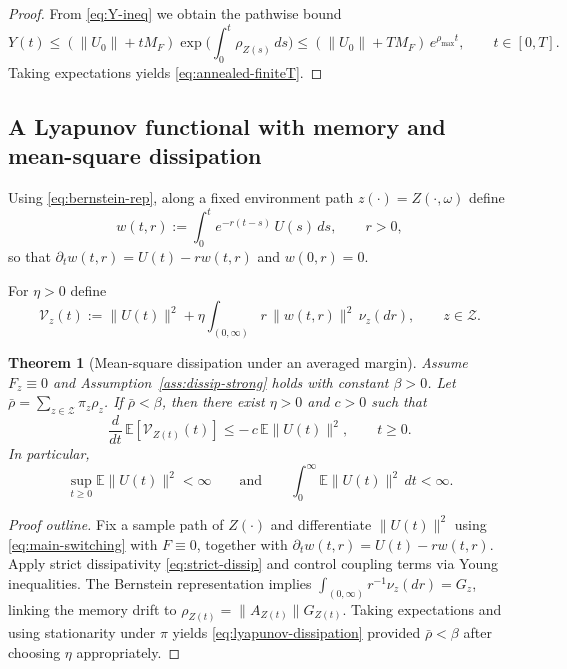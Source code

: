 \documentclass[12pt,a4paper]{article}
\theoremstyle{plain}
\newtheorem{theorem}{Theorem}[section]
\theoremstyle{definition}
\theoremstyle{remark}
\begin{document}
\begin{proof}
	From \eqref{eq:Y-ineq} we obtain the pathwise bound
	\[
	Y(t)\le (\|U_0\|+tM_F)\exp\!\Big(\int_0^t \rho_{Z(s)}\,ds\Big)
	\le (\|U_0\|+TM_F)\,e^{\rho_{\max}t},
	\qquad t\in[0,T].
	\]
	Taking expectations yields \eqref{eq:annealed-finiteT}.
\end{proof}

\subsection{A Lyapunov functional with memory and mean-square dissipation}
\label{subsec:lyap}

Using \eqref{eq:bernstein-rep}, along a fixed environment path $z(\cdot)=Z(\cdot,\omega)$ define
\begin{equation}
	\label{eq:aux-memory}
	w(t,r):=\int_0^t e^{-r(t-s)}\,U(s)\,ds,
	\qquad r>0,
\end{equation}
so that $\partial_t w(t,r)=U(t)-r w(t,r)$ and $w(0,r)=0$.

For $\eta>0$ define
\begin{equation}
	\label{eq:lyapunov}
	\mathcal V_{z}(t)
	:=
	\|U(t)\|^2
	+
	\eta\int_{(0,\infty)} r\,\|w(t,r)\|^2\,\nu_{z}(dr),
	\qquad z\in\mathcal Z.
\end{equation}

\begin{theorem}[Mean-square dissipation under an averaged margin]
	\label{thm:lyapunov-mean-stability}
	Assume $F_z\equiv 0$ and Assumption~\ref{ass:dissip-strong} holds with constant $\beta>0$.
	Let $\bar\rho=\sum_{z\in\mathcal Z}\pi_z\rho_z$.
	If $\bar\rho<\beta$, then there exist $\eta>0$ and $c>0$ such that
	\begin{equation}
		\label{eq:lyapunov-dissipation}
		\frac{d}{dt}\,\mathbb E\!\left[\mathcal V_{Z(t)}(t)\right]
		\le
		-\,c\,\mathbb E\|U(t)\|^2,
		\qquad t\ge 0.
	\end{equation}
	In particular,
	\begin{equation}
		\label{eq:mean-square-bound}
		\sup_{t\ge 0}\mathbb E\|U(t)\|^2<\infty
		\qquad\text{and}\qquad
		\int_0^\infty \mathbb E\|U(t)\|^2\,dt <\infty.
	\end{equation}
\end{theorem}

\begin{proof}[Proof outline]
	Fix a sample path of $Z(\cdot)$ and differentiate $\|U(t)\|^2$ using \eqref{eq:main-switching}
	with $F\equiv 0$, together with $\partial_t w(t,r)=U(t)-r w(t,r)$.
	Apply strict dissipativity \eqref{eq:strict-dissip} and control coupling terms via Young inequalities.
	The Bernstein representation implies $\int_{(0,\infty)} r^{-1}\nu_z(dr)=G_z$, linking the memory drift to
	$\rho_{Z(t)}=\|A_{Z(t)}\|G_{Z(t)}$. Taking expectations and using stationarity under $\pi$ yields
	\eqref{eq:lyapunov-dissipation} provided $\bar\rho<\beta$ after choosing $\eta$ appropriately.
\end{proof}
\end{document}
